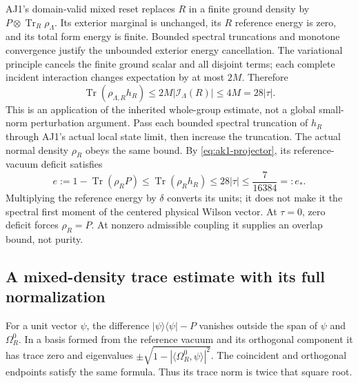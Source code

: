 AJ1's domain-valid mixed reset replaces $R$ in a finite ground density by $P\otimes\operatorname{Tr}_R\rho_\Lambda$. Its exterior marginal is unchanged, its $R$ reference energy is zero, and its total form energy is finite. Bounded spectral truncations and monotone convergence justify the unbounded exterior energy cancellation. The variational principle cancels the finite ground scalar and all disjoint terms; each complete incident interaction changes expectation by at most $2M$. Therefore
\begin{equation}
 \operatorname{Tr}(\rho_{\Lambda,R}h_R)
 \le2M|\mathcal I_\Lambda(R)|\le4M=28|\tau|.
 \label{eq:ak1-reset}
\end{equation}
This is an application of the inherited whole-group estimate, not a global small-norm perturbation argument. Pass each bounded spectral truncation of $h_R$ through AJ1's actual local state limit, then increase the truncation. The actual normal density $\rho_R$ obeys the same bound. By \eqref{eq:ak1-projector}, its reference-vacuum deficit satisfies
\begin{equation}
 e:=1-\operatorname{Tr}(\rho_RP)
 \le\operatorname{Tr}(\rho_Rh_R)\le28|\tau|
 \le\frac7{16384}=:e_*.
 \label{eq:ak1-deficit}
\end{equation}
Multiplying the reference energy by $\delta$ converts its units; it does not make it the spectral first moment of the centered physical Wilson vector. At $\tau=0$, zero deficit forces $\rho_R=P$. At nonzero admissible coupling it supplies an overlap bound, not purity.

\subsection{A mixed-density trace estimate with its full normalization}
For a unit vector $\psi$, the difference $|\psi\rangle\langle\psi|-P$ vanishes outside the span of $\psi$ and $\Omega_R^0$. In a basis formed from the reference vacuum and its orthogonal component it has trace zero and eigenvalues $\pm\sqrt{1-|\langle\Omega_R^0,\psi\rangle|^2}$. The coincident and orthogonal endpoints satisfy the same formula. Thus its trace norm is twice that square root.

